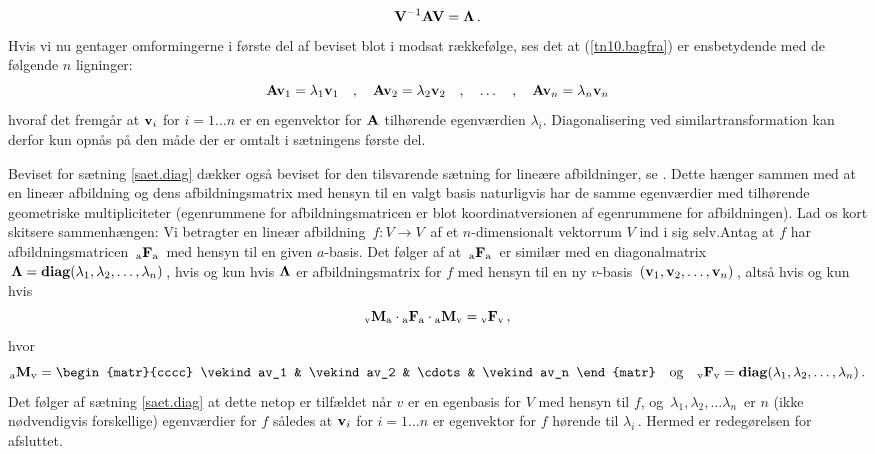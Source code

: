 \begin{bevis}
\begin{equation} \label{tn10.bagfra}
\mathbf{V}^{-1} \mathbf{A} \mathbf{V} = \bm{\Lambda}\,.
\end{equation}
Hvis vi nu gentager omformingerne i første del af beviset  blot i modsat rækkefølge, ses det at (\ref{tn10.bagfra}) er ensbetydende med de følgende $n$ ligninger:
\begin{equation}
\mathbf{A}\mathbf{v}_1 = \lambda_1 \mathbf{v}_1 \quad , \quad \mathbf{A}\mathbf{v}_2 = \lambda_2 \mathbf{v}_2 \quad , \quad \ldots \quad , \quad \mathbf{A}\mathbf{v}_n = \lambda_n \mathbf{v}_n
\end{equation}
hvoraf det fremgår at $\mathbf{v}_i$ for $i=1\ldots n$ er en egenvektor for $ \mathbf{A} $ tilhørende egenværdien $ \lambda_i $. \bs
Diagonalisering ved similartransformation kan derfor kun opnås på den måde der er omtalt i sætningens første del.
\end{bevis}

\begin{remark}

Beviset for sætning \ref{saet.diag} dækker også beviset for den tilsvarende sætning for lineære afbildninger, se
. Dette hænger sammen med at en lineær afbildning og dens afbildningsmatrix med hensyn til en valgt basis naturligvis har de samme egenværdier med tilhørende geometriske multipliciteter (egenrummene for afbildningsmatricen er blot koordinatversionen af egenrummene for afbildningen). Lad os kort skitsere sammenhængen:\bs
Vi betragter en lineær afbildning $\,f:V\rightarrow V\,$ af et $n$-dimensionalt vektorrum $V$ ind i sig selv.\bs Antag at $f$ har afbildningsmatricen $\, {_\mathrm{a}\mathbf{F}_\mathrm{a}}\, $ med hensyn til en given $a$-basis. Det følger af   at  $\, {_\mathrm{a}\mathbf{F}_\mathrm{a}}\, $ er similær med en diagonalmatrix $\,\bm{\Lambda}=\operatorname{\bf{diag}}(\lambda_1, \lambda_2, \ldots, \lambda_n)\,$, hvis og kun hvis $\bm{\Lambda}$ er afbildningsmatrix for $f$ med hensyn til en ny $v$-basis $\,(\mathbf{v}_1,\mathbf{v}_2,\ldots, \mathbf{v}_n)\,$, altså hvis og kun hvis 
\begin{equation}
{_\mathrm{v}\mathbf{M}_\mathrm{a}} \cdot {_\mathrm{a}\mathbf{F}_\mathrm{a}} \cdot {_\mathrm{a}\mathbf{M}_\mathrm{v}} = {_\mathrm{v}\mathbf{F}_\mathrm{v}} \, ,
\end{equation}
hvor
\begin{equation}
\matind aMv = \begin{matr}{cccc} \vekind av_1 & \vekind av_2 & \cdots & \vekind av_n \end{matr} \quad \mathrm{og} \quad \matind vFv = \diag(\lambda_1, \lambda_2, \ldots, \lambda_n) \, .
\end{equation}
Det følger af sætning \ref{saet.diag} at dette netop er tilfældet når $v$ er en egenbasis for $V$ med hensyn til $f$, og $\,\lambda_1,\lambda_2,\ldots \lambda_n\,$ er $n$ (ikke nødvendigvis forskellige) egenværdier for $f$ således at $\mathbf{v}_i$ for $i=1\ldots n$ er egenvektor for $f$ hørende til $\lambda_i\,$.\bs
Hermed er redegørelsen for  afsluttet.
\end{remark}

